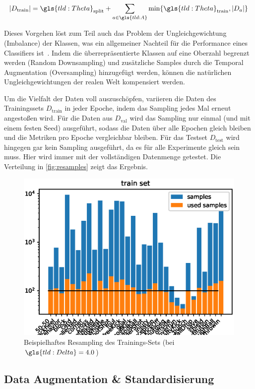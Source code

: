 \begin{equation}
    \label{eq:limit}
    | D_\text{train} | = \gls{tld:Theta}_\text{split} + \sum\limits_{a \in \gls{tld:A}} \min \{ \gls{tld:Theta}_\text{train}, |D_a| \}
\end{equation}

Dieses Vorgehen löst zum Teil auch das Problem der Ungleichgewichtung (Imbalance) der Klassen, was ein allgemeiner Nachteil für die Performance eines Classifiers ist~\cite{Giancola18, Burkov19}.
Indem die überrepräsentierte Klassen auf eine Oberzahl begrenzt werden (Random Downsampling) und zusätzliche Samples durch die Temporal Augmentation (Oversampling) hinzugefügt werden, können die natürlichen Ungleichgewichtungen der realen Welt kompensiert werden.

Um die Vielfalt der Daten voll auszuschöpfen, variieren die Daten des Trainingssets $D_{\text{train}}$ in jeder Epoche, indem das Sampling jedes Mal erneut angestoßen wird.
Für die Daten aus $D_\text{val}$ wird das Sampling nur einmal (und mit einem festen Seed) ausgeführt, sodass die Daten über alle Epochen gleich bleiben und die Metriken pro Epoche vergleichbar bleiben.
Für das Testset $D_\text{test}$ wird hingegen gar kein Sampling ausgeführt, da es für alle Experimente gleich sein muss.
Hier wird immer mit der vollständigen Datenmenge getestet.
Die Verteilung in \autoref{fig:resamples} zeigt das Ergebnis.

\begin{figure}
    \centering
    \includegraphics[width=.6\linewidth]{img/data-plots/4sec/class_distribution_used_samples_train_202010-1419-3803.eps}
    \caption{Beispielhaftes Resampling des Trainings-Sets (bei $\gls{tld:Delta} = 4.0$)}
    \label{fig:resamples}
\end{figure}

\subsection{Data Augmentation \& Standardisierung}
\label{subsec:data-augmentation}

